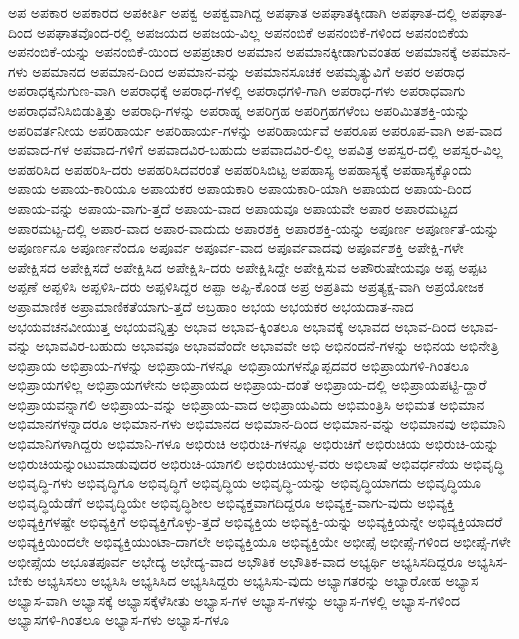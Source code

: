 {ಅಪ
ಅಪಕಾರ
ಅಪಕಾರದ
ಅಪಕೀರ್ತಿ
ಅಪಕ್ವ
ಅಪಕ್ವವಾಗಿದ್ದ
ಅಪಘಾತ
ಅಪಘಾತಕ್ಕೀಡಾಗಿ
ಅಪಘಾತ-ದಲ್ಲಿ
ಅಪಘಾತ-ದಿಂದ
ಅಪಘಾತವೊಂದ-ರಲ್ಲಿ
ಅಪಜಯದ
ಅಪಜಯ-ವಿಲ್ಲ
ಅಪನಂಬಿಕೆ
ಅಪನಂಬಿಕೆ-ಗಳಿಂದ
ಅಪನಂಬಿಕೆಯ
ಅಪನಂಬಿಕೆ-ಯನ್ನು
ಅಪನಂಬಿಕೆ-ಯಿಂದ
ಅಪಪ್ರಚಾರ
ಅಪಮಾನ
ಅಪಮಾನಕ್ಕೀಡಾಗುವಂತಹ
ಅಪಮಾನಕ್ಕೆ
ಅಪಮಾನ-ಗಳು
ಅಪಮಾನದ
ಅಪಮಾನ-ದಿಂದ
ಅಪಮಾನ-ವನ್ನು
ಅಪಮಾನಸೂಚಕ
ಅಪಮೃತ್ಯುವಿಗೆ
ಅಪರ
ಅಪರಾಧ
ಅಪರಾಧಕ್ಕನುಗುಣ-ವಾಗಿ
ಅಪರಾಧಕ್ಕೆ
ಅಪರಾಧ-ಗಳಲ್ಲಿ
ಅಪರಾಧಗಳಿ-ಗಾಗಿ
ಅಪರಾಧ-ಗಳು
ಅಪರಾಧವಾಗು
ಅಪರಾಧವೆನಿಸಿಬಿಡುತ್ತಿತ್ತು
ಅಪರಾಧಿ-ಗಳನ್ನು
ಅಪರಾಹ್ನ
ಅಪರಿಗ್ರಹ
ಅಪರಿಗ್ರಹಗಳೆಂಬ
ಅಪರಿಮಿತಶಕ್ತಿ-ಯನ್ನು
ಅಪರಿವರ್ತನೀಯ
ಅಪರಿಹಾರ್ಯ
ಅಪರಿಹಾರ್ಯ-ಗಳನ್ನು
ಅಪರಿಹಾರ್ಯವೆ
ಅಪರೂಪ
ಅಪರೂಪ-ವಾಗಿ
ಅಪ-ವಾದ
ಅಪವಾದ-ಗಳ
ಅಪವಾದ-ಗಳಿಗೆ
ಅಪವಾದವಿರ-ಬಹುದು
ಅಪವಾದವಿರ-ಲಿಲ್ಲ
ಅಪವಿತ್ರ
ಅಪಸ್ವರ-ದಲ್ಲಿ
ಅಪಸ್ವರ-ವಿಲ್ಲ
ಅಪಹರಿಸಿದ
ಅಪಹರಿಸಿ-ದರು
ಅಪಹರಿಸಿದವರಂತೆ
ಅಪಹರಿಸಿಬಿಟ್ಟ
ಅಪಹಾಸ್ಯ
ಅಪಹಾಸ್ಯಕ್ಕೆ
ಅಪಹಾಸ್ಯಕ್ಕೊಂದು
ಅಪಾಯ
ಅಪಾಯ-ಕಾರಿಯೂ
ಅಪಾಯಕರ
ಅಪಾಯಕಾರಿ
ಅಪಾಯಕಾರಿ-ಯಾಗಿ
ಅಪಾಯದ
ಅಪಾಯ-ದಿಂದ
ಅಪಾಯ-ವನ್ನು
ಅಪಾಯ-ವಾಗು-ತ್ತದೆ
ಅಪಾಯ-ವಾದ
ಅಪಾಯವೂ
ಅಪಾಯವೇ
ಅಪಾರ
ಅಪಾರಮಟ್ಟದ
ಅಪಾರಮಟ್ಟ-ದಲ್ಲಿ
ಅಪಾರ-ವಾದ
ಅಪಾರ-ವಾದುದು
ಅಪಾರಶಕ್ತಿ
ಅಪಾರಶಕ್ತಿ-ಯನ್ನು
ಅಪೂರ್ಣ
ಅಪೂರ್ಣತೆ-ಯನ್ನು
ಅಪೂರ್ಣನೂ
ಅಪೂರ್ಣನೆಂದೂ
ಅಪೂರ್ವ
ಅಪೂರ್ವ-ವಾದ
ಅಪೂರ್ವವಾದವು
ಅಪೂರ್ವಶಕ್ತಿ
ಅಪೇಕ್ಷಿ-ಗಳೇ
ಅಪೇಕ್ಷಿಸದ
ಅಪೇಕ್ಷಿಸದೆ
ಅಪೇಕ್ಷಿಸಿದ
ಅಪೇಕ್ಷಿಸಿ-ದರು
ಅಪೇಕ್ಷಿಸಿದ್ದೇ
ಅಪೇಕ್ಷಿಸುವ
ಅಪೌರುಷೇಯವೂ
ಅಪ್ಪ
ಅಪ್ಪಟ
ಅಪ್ಪಣೆ
ಅಪ್ಪಳಿಸಿ
ಅಪ್ಪಳಿಸಿ-ದರು
ಅಪ್ಪಳಿಸಿದ್ದರ
ಅಪ್ಪಾ
ಅಪ್ಪಿ-ಕೊಂಡ
ಅಪ್ರ
ಅಪ್ರತಿಮ
ಅಪ್ರತ್ಯಕ್ಷ-ವಾಗಿ
ಅಪ್ರಯೋಜಕ
ಅಪ್ರಾಮಾಣಿಕ
ಅಪ್ರಾಮಾಣಿಕತೆಯಾಗು-ತ್ತದೆ
ಅಬ್ರಹಾಂ
ಅಭಯ
ಅಭಯಕರ
ಅಭಯದಾತ-ನಾದ
ಅಭಯವಚನವೀಯುತ್ತ
ಅಭಯವನ್ನಿತ್ತು
ಅಭಾವ
ಅಭಾವ-ಕ್ಕಿಂತಲೂ
ಅಭಾವಕ್ಕೆ
ಅಭಾವದ
ಅಭಾವ-ದಿಂದ
ಅಭಾವ-ವನ್ನು
ಅಭಾವವಿರ-ಬಹುದು
ಅಭಾವವೂ
ಅಭಾವವೆಂದೇ
ಅಭಾವವೇ
ಅಭಿ
ಅಭಿನಂದನೆ-ಗಳನ್ನು
ಅಭಿನಯ
ಅಭಿನೇತ್ರಿ
ಅಭಿಪ್ರಾಯ
ಅಭಿಪ್ರಾಯ-ಗಳನ್ನು
ಅಭಿಪ್ರಾಯ-ಗಳನ್ನೂ
ಅಭಿಪ್ರಾಯಗಳನ್ನೊಪ್ಪದವರ
ಅಭಿಪ್ರಾಯಗಳಿ-ಗಿಂತಲೂ
ಅಭಿಪ್ರಾಯಗಳಿಲ್ಲ
ಅಭಿಪ್ರಾಯಗಳೇನು
ಅಭಿಪ್ರಾಯದ
ಅಭಿಪ್ರಾಯ-ದಂತೆ
ಅಭಿಪ್ರಾಯ-ದಲ್ಲಿ
ಅಭಿಪ್ರಾಯಪಟ್ಟಿ-ದ್ದಾರೆ
ಅಭಿಪ್ರಾಯವನ್ನಾಗಲಿ
ಅಭಿಪ್ರಾಯ-ವನ್ನು
ಅಭಿಪ್ರಾಯ-ವಾದ
ಅಭಿಪ್ರಾಯವಿದು
ಅಭಿಮಂತ್ರಿಸಿ
ಅಭಿಮತ
ಅಭಿಮಾನ
ಅಭಿಮಾನಗಳನ್ನಾದರೂ
ಅಭಿಮಾನ-ಗಳು
ಅಭಿಮಾನದ
ಅಭಿಮಾನ-ದಿಂದ
ಅಭಿಮಾನ-ವನ್ನು
ಅಭಿಮಾನವು
ಅಭಿಮಾನಿ
ಅಭಿಮಾನಿಗಳಾಗಿದ್ದರು
ಅಭಿಮಾನಿ-ಗಳೂ
ಅಭಿರುಚಿ
ಅಭಿರುಚಿ-ಗಳನ್ನೂ
ಅಭಿರುಚಿಗೆ
ಅಭಿರುಚಿಯ
ಅಭಿರುಚಿ-ಯನ್ನು
ಅಭಿರುಚಿಯನ್ನುಂಟುಮಾಡುವುದರ
ಅಭಿರುಚಿ-ಯಾಗಲಿ
ಅಭಿರುಚಿಯುಳ್ಳ-ವರು
ಅಭಿಲಾಷೆ
ಅಭಿವರ್ಧನೆಯ
ಅಭಿವೃದ್ಧಿ
ಅಭಿವೃದ್ಧಿ-ಗಳು
ಅಭಿವೃದ್ಧಿಗೂ
ಅಭಿವೃದ್ಧಿಗೆ
ಅಭಿವೃದ್ಧಿಯ
ಅಭಿವೃದ್ಧಿ-ಯನ್ನು
ಅಭಿವೃದ್ಧಿಯಾಗದು
ಅಭಿವೃದ್ಧಿಯೂ
ಅಭಿವೃದ್ಧಿಯೆಡೆಗೆ
ಅಭಿವೃದ್ಧಿಯೇ
ಅಭಿವೃದ್ಧಿಶೀಲ
ಅಭಿವ್ಯಕ್ತವಾಗದಿದ್ದರೂ
ಅಭಿವ್ಯಕ್ತ-ವಾಗು-ವುದು
ಅಭಿವ್ಯಕ್ತಿ
ಅಭಿವ್ಯಕ್ತಿಗಳಷ್ಟೇ
ಅಭಿವ್ಯಕ್ತಿಗೆ
ಅಭಿವ್ಯಕ್ತಿಗೊಳ್ಳು-ತ್ತದೆ
ಅಭಿವ್ಯಕ್ತಿಯ
ಅಭಿವ್ಯಕ್ತಿ-ಯನ್ನು
ಅಭಿವ್ಯಕ್ತಿಯನ್ನೇ
ಅಭಿವ್ಯಕ್ತಿಯಾದರೆ
ಅಭಿವ್ಯಕ್ತಿಯಿಂದಲೇ
ಅಭಿವ್ಯಕ್ತಿಯುಂಟಾ-ದಾಗಲೇ
ಅಭಿವ್ಯಕ್ತಿಯೂ
ಅಭಿವ್ಯಕ್ತಿಯೇ
ಅಭೀಪ್ಸೆ
ಅಭೀಪ್ಸೆ-ಗಳಿಂದ
ಅಭೀಪ್ಸೆ-ಗಳೇ
ಅಭೀಪ್ಸೆಯ
ಅಭೂತಪೂರ್ವ
ಅಭೇದ್ಯ
ಅಭೇದ್ಯ-ವಾದ
ಅಭೌತಿಕ
ಅಭೌತಿಕ-ವಾದ
ಅಭ್ಯರ್ಥಿ
ಅಭ್ಯಸಿಸದಿದ್ದರೂ
ಅಭ್ಯಸಿಸ-ಬೇಕು
ಅಭ್ಯಸಿಸಲು
ಅಭ್ಯಸಿಸಿ
ಅಭ್ಯಸಿಸಿದ
ಅಭ್ಯಸಿಸಿದ್ದರು
ಅಭ್ಯಸಿಸು-ವುದು
ಅಭ್ಯಾಗತರನ್ನು
ಅಭ್ಯಾರೋಹ
ಅಭ್ಯಾಸ
ಅಭ್ಯಾಸ-ವಾಗಿ
ಅಭ್ಯಾಸಕ್ಕೆ
ಅಭ್ಯಾಸಕ್ಕೆಳೆಸೀತು
ಅಭ್ಯಾಸ-ಗಳ
ಅಭ್ಯಾಸ-ಗಳನ್ನು
ಅಭ್ಯಾಸ-ಗಳಲ್ಲಿ
ಅಭ್ಯಾಸ-ಗಳಿಂದ
ಅಭ್ಯಾಸಗಳಿ-ಗಿಂತಲೂ
ಅಭ್ಯಾಸ-ಗಳು
ಅಭ್ಯಾಸ-ಗಳೂ
}
